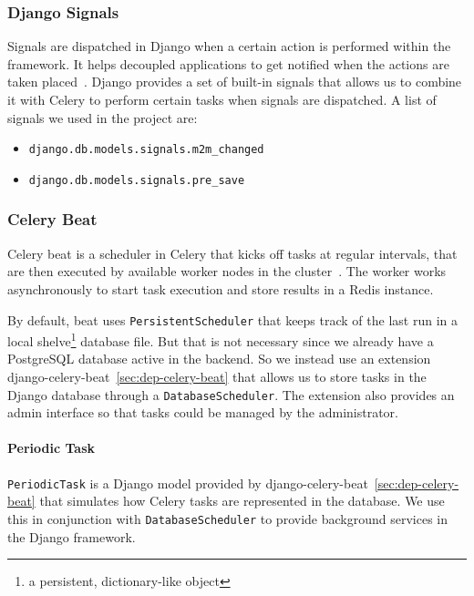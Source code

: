 \subsubsection{Django Signals}
Signals are dispatched in Django when a certain action is performed within the
framework. It helps decoupled applications to get notified when the actions are
taken placed~\cite{django-signals}. Django provides a set of built-in signals
that allows us to combine it with Celery to perform certain tasks when signals
are dispatched. A list of signals we used in the project are:

\begin{itemize}
  \item \texttt{django.db.models.signals.m2m\_changed}
  \item \texttt{django.db.models.signals.pre\_save}
\end{itemize}

\subsubsection{Celery Beat}
Celery beat is a scheduler in Celery that kicks off tasks at regular intervals,
that are then executed by available worker nodes in the cluster~\cite{celery-beat}.
The worker works asynchronously to start task execution and store results in
a Redis instance.

By default, beat uses \texttt{PersistentScheduler} that keeps track of the last
run in a local shelve\footnote{a persistent, dictionary-like object} database
file. But that is not necessary since we already have a PostgreSQL database
active in the backend. So we instead use an extension
django-celery-beat~\ref{sec:dep-celery-beat} that allows us to store tasks in
the Django database through a \texttt{DatabaseScheduler}. The extension also
provides an admin interface so that tasks could be managed by the administrator.

\paragraph{Periodic Task}
\texttt{PeriodicTask} is a Django model provided by
django-celery-beat~\ref{sec:dep-celery-beat} that simulates how Celery tasks are
represented in the database. We use this in conjunction with
\texttt{DatabaseScheduler} to provide background services in the Django
framework.

